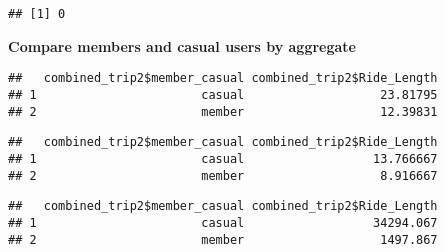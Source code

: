 \documentclass[
]{article}
\newenvironment{Shaded}{\begin{snugshade}}{\end{snugshade}}
\newcommand{\AttributeTok}[1]{\textcolor[rgb]{0.77,0.63,0.00}{#1}}
\newcommand{\FunctionTok}[1]{\textcolor[rgb]{0.00,0.00,0.00}{#1}}
\newcommand{\NormalTok}[1]{#1}
\newcommand{\SpecialCharTok}[1]{\textcolor[rgb]{0.00,0.00,0.00}{#1}}
\begin{document}
\begin{verbatim}
## [1] 0
\end{verbatim}

\textbf{Compare members and casual users by aggregate}

\begin{Shaded}
\end{Shaded}

\begin{verbatim}
##   combined_trip2$member_casual combined_trip2$Ride_Length
## 1                       casual                   23.81795
## 2                       member                   12.39831
\end{verbatim}

\begin{Shaded}
\end{Shaded}

\begin{verbatim}
##   combined_trip2$member_casual combined_trip2$Ride_Length
## 1                       casual                  13.766667
## 2                       member                   8.916667
\end{verbatim}

\begin{Shaded}
\end{Shaded}

\begin{verbatim}
##   combined_trip2$member_casual combined_trip2$Ride_Length
## 1                       casual                  34294.067
## 2                       member                   1497.867
\end{verbatim}
\end{document}
